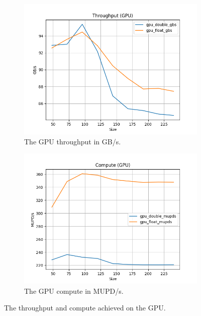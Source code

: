 \documentclass[10pt]{article}
\begin{document}
\begin{figure}[!ht]
        \centering
    \begin{subfigure}[b]{0.49\textwidth}
        \centering
        \includegraphics[width=\linewidth]{figs/gpu_gbs.png}
        \caption{The GPU throughput in GB/s.}
        \label{fig:gpu_gbs}
    \end{subfigure}\hfill
    \begin{subfigure}[b]{0.49\textwidth}
        \centering
        \includegraphics[width=\linewidth]{figs/gpu_mupds.png}
        \caption{The GPU compute in MUPD/s.}
        \label{fig:gpu_mupds}
    \end{subfigure}\hfill
    \caption{The throughput and compute achieved on the GPU.}
    \label{fig:gpu}
\end{figure}
\end{document}
